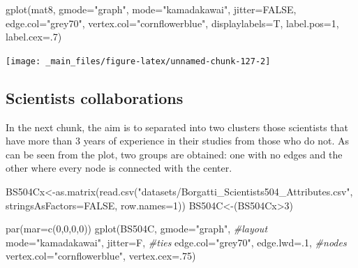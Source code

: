 \documentclass[
  notitlepage,
  onecolumn,
  openany]{book}
\newenvironment{Shaded}{\begin{snugshade}}{\end{snugshade}}
\newcommand{\AttributeTok}[1]{\textcolor[rgb]{0.77,0.63,0.00}{#1}}
\newcommand{\CommentTok}[1]{\textcolor[rgb]{0.56,0.35,0.01}{\textit{#1}}}
\newcommand{\ConstantTok}[1]{\textcolor[rgb]{0.00,0.00,0.00}{#1}}
\newcommand{\DecValTok}[1]{\textcolor[rgb]{0.00,0.00,0.81}{#1}}
\newcommand{\FunctionTok}[1]{\textcolor[rgb]{0.00,0.00,0.00}{#1}}
\newcommand{\NormalTok}[1]{#1}
\newcommand{\OtherTok}[1]{\textcolor[rgb]{0.56,0.35,0.01}{#1}}
\newcommand{\SpecialCharTok}[1]{\textcolor[rgb]{0.00,0.00,0.00}{#1}}
\newcommand{\StringTok}[1]{\textcolor[rgb]{0.31,0.60,0.02}{#1}}
\begin{document}
\begin{Shaded}
\begin{Highlighting}[]
\FunctionTok{gplot}\NormalTok{(mat8, }
      \AttributeTok{gmode=}\StringTok{"graph"}\NormalTok{,}
      \AttributeTok{mode=}\StringTok{"kamadakawai"}\NormalTok{,}
      \AttributeTok{jitter=}\ConstantTok{FALSE}\NormalTok{,}
      \AttributeTok{edge.col=}\StringTok{"grey70"}\NormalTok{,}
      \AttributeTok{vertex.col=}\StringTok{"cornflowerblue"}\NormalTok{,}
      \AttributeTok{displaylabels=}\NormalTok{T,}
      \AttributeTok{label.pos=}\DecValTok{1}\NormalTok{,}
      \AttributeTok{label.cex=}\NormalTok{.}\DecValTok{7}\NormalTok{)}
\end{Highlighting}
\end{Shaded}

\begin{center}\texttt{[image: \_main\_files/figure-latex/unnamed-chunk-127-2]} \end{center}

\hypertarget{scientists-collaborations}{%
\subsection{Scientists collaborations}\label{scientists-collaborations}}

In the next chunk, the aim is to separated into two clusters those scientists that have more than 3 years of experience in their studies from those who do not. As can be seen from the plot, two groups are obtained: one with no edges and the other where every node is connected with the center.

\begin{Shaded}
\begin{Highlighting}[]
\NormalTok{BS504Cx}\OtherTok{\textless{}{-}}\FunctionTok{as.matrix}\NormalTok{(}\FunctionTok{read.csv}\NormalTok{(}\StringTok{"datasets/Borgatti\_Scientists504\_Attributes.csv"}\NormalTok{,}
                            \AttributeTok{stringsAsFactors=}\ConstantTok{FALSE}\NormalTok{, }\AttributeTok{row.names=}\DecValTok{1}\NormalTok{))}
\NormalTok{BS504C}\OtherTok{\textless{}{-}}\NormalTok{(BS504Cx}\SpecialCharTok{\textgreater{}}\DecValTok{3}\NormalTok{)}

\FunctionTok{par}\NormalTok{(}\AttributeTok{mar=}\FunctionTok{c}\NormalTok{(}\DecValTok{0}\NormalTok{,}\DecValTok{0}\NormalTok{,}\DecValTok{0}\NormalTok{,}\DecValTok{0}\NormalTok{))}
\FunctionTok{gplot}\NormalTok{(BS504C, }
      \AttributeTok{gmode=}\StringTok{"graph"}\NormalTok{,}
      \CommentTok{\#layout}
      \AttributeTok{mode=}\StringTok{"kamadakawai"}\NormalTok{,}
      \AttributeTok{jitter=}\NormalTok{F,}
      \CommentTok{\#ties}
      \AttributeTok{edge.col=}\StringTok{"grey70"}\NormalTok{, }
      \AttributeTok{edge.lwd=}\NormalTok{.}\DecValTok{1}\NormalTok{,}
      \CommentTok{\#nodes}
      \AttributeTok{vertex.col=}\StringTok{"cornflowerblue"}\NormalTok{,}
      \AttributeTok{vertex.cex=}\NormalTok{.}\DecValTok{75}\NormalTok{)}
\end{Highlighting}
\end{Shaded}
\end{document}
